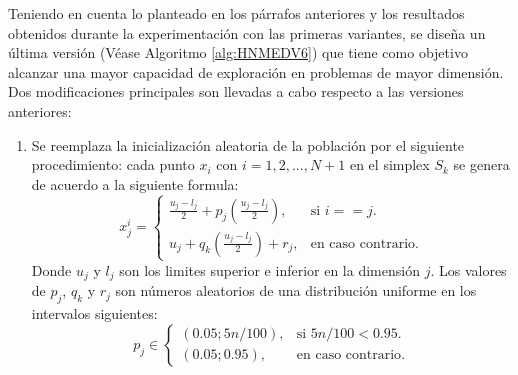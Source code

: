 Teniendo en cuenta lo planteado en los párrafos anteriores y los resultados obtenidos durante la experimentación con las primeras variantes, se diseña un última versión (Véase Algoritmo \ref{alg:HNMEDV6}) que tiene como objetivo alcanzar una mayor capacidad de exploración en problemas de mayor dimensión. Dos modificaciones principales son llevadas a cabo respecto a las versiones anteriores:
\begin{enumerate}
	\item Se reemplaza la inicialización aleatoria de la población por el siguiente procedimiento: cada punto $x_i$ con $i ={ 1,2,...,N+1}$ en  el simplex $S_k$ se genera de acuerdo a la siguiente formula:
	\begin{equation}\label{eq:Inicializacion de Simpleces}
	x^i_j=\begin{cases}
	\frac{u_j-l_j}{2}+p_j(\frac{u_j-l_j}{2}), & \text{si $i==j$}.\\
	u_j+q_k(\frac{u_j-l_j}{2})+r_j, & \text{en caso contrario}.
	\end{cases}
	\end{equation}
	Donde $u_j$ y $l_j$ son los limites superior e inferior en la dimensión $j$. Los valores de  $p_j$, $q_k$ y $r_j$ son números aleatorios de una distribución uniforme en los intervalos siguientes:
	\begin{equation}
	p_j \in \begin{cases}
	(0.05;5n/100), & \text{si $5n/100 <0.95$}.\\
	(0.05;0.95), & \text{en caso contrario}.
	\end{cases}
	\end{equation}
	

\end{enumerate}
